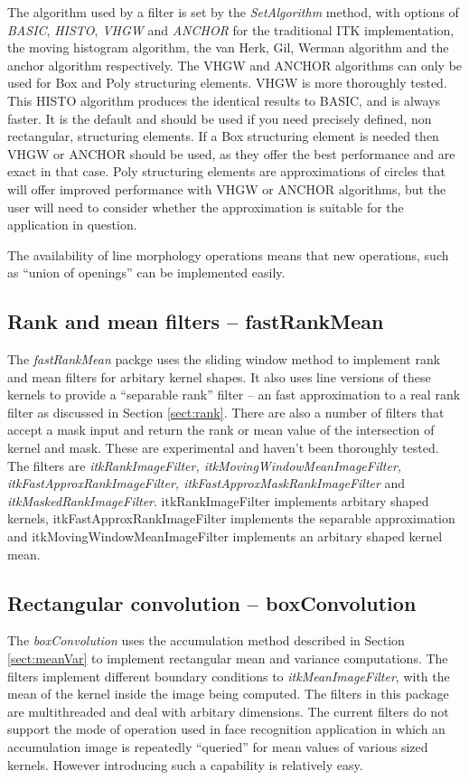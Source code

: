 \documentclass{InsightArticle}
\begin{document}
The algorithm used by a filter is set by the {\em SetAlgorithm}
method, with options of {\em BASIC}, {\em HISTO}, {\em VHGW} and {\em
ANCHOR} for the traditional ITK implementation, the moving histogram
algorithm, the van Herk, Gil, Werman algorithm and the anchor
algorithm respectively. The VHGW and ANCHOR algorithms can only be
used for Box and Poly structuring elements. VHGW is more thoroughly
tested. This HISTO algorithm produces the identical results to BASIC,
and is always faster. It is the default and should be used if you need
precisely defined, non rectangular, structuring elements. If a Box
structuring element is needed then VHGW or ANCHOR should be used, as
they offer the best performance and are exact in that case. Poly
structuring elements are approximations of circles that will offer
improved performance with VHGW or ANCHOR algorithms, but the user will
need to consider whether the approximation is suitable for the
application in question.

The availability of line morphology operations means that new
operations, such as ``union of openings'' can be implemented easily.

\subsection{Rank and mean filters -- fastRankMean}
The {\em fastRankMean} packge uses the sliding window method to
implement rank and mean filters for arbitary kernel shapes. It also
uses line versions of these kernels to provide a ``separable rank''
filter -- an fast approximation to a real rank filter as discussed in
Section \ref{sect:rank}. There are also a number of filters that
accept a mask input and return the rank or mean value of the
intersection of kernel and mask. These are experimental and haven't
been thoroughly tested. The filters are {\em itkRankImageFilter,
itkMovingWindowMeanImageFilter, itkFastApproxRankImageFilter,
itkFastApproxMaskRankImageFilter} and {\em
itkMaskedRankImageFilter}. itkRankImageFilter implements arbitary
shaped kernels, itkFastApproxRankImageFilter implements the separable
approximation and itkMovingWindowMeanImageFilter implements an
arbitary shaped kernel mean.

\subsection{Rectangular convolution -- boxConvolution}
The {\em boxConvolution} uses the accumulation method described in
Section \ref{sect:meanVar} to implement rectangular mean and variance
computations. The filters implement different boundary conditions to
{\em itkMeanImageFilter}, with the mean of the kernel inside the image
being computed. The filters in this package are multithreaded and deal
with arbitary dimensions. The current filters do not support the mode
of operation used in face recognition application in which an
accumulation image is repeatedly ``queried'' for mean values of
various sized kernels. However introducing such a capability is
relatively easy.
\end{document}
